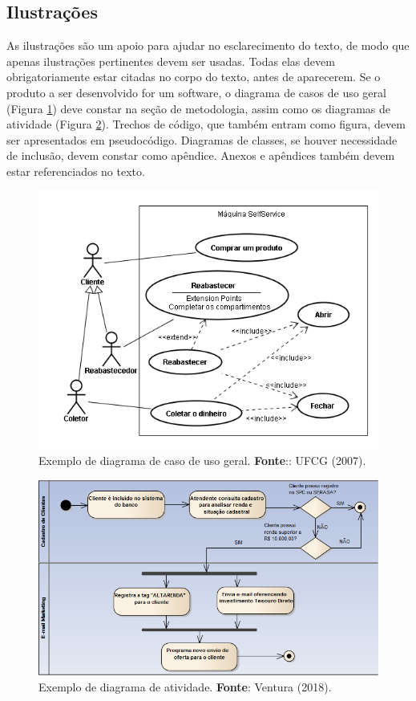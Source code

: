 \subsection{Ilustrações}\label{sec:Ilustracoes}
As ilustrações são um apoio para ajudar no esclarecimento do texto, de modo que apenas ilustrações pertinentes devem ser usadas. Todas elas devem obrigatoriamente estar citadas no corpo do texto, antes de aparecerem. 
Se o produto a ser desenvolvido for um software, o diagrama de casos de uso geral (Figura \ref{fig:CasoDeUso}) deve constar na seção de metodologia, assim como os diagramas de atividade (Figura \ref{fig:Atividades}). Trechos de código, que também entram como figura, devem ser apresentados em pseudocódigo. Diagramas de classes, se houver necessidade de inclusão, devem constar como apêndice. Anexos e apêndices também devem estar referenciados no texto. 

\begin{figure}[htb]
	\centering
	\includegraphics[scale=0.6]{imagens/DiagramaCasoDeUso.png} 
	\caption{Exemplo de diagrama de caso de uso geral. \textbf{Fonte}:: UFCG (2007).}
	\label{fig:CasoDeUso}
\end{figure}

\begin{figure}[htb]
	\centering
	\includegraphics[scale=0.6]{imagens/DiagramaAtividades.png} 
	\caption{Exemplo de diagrama de atividade. \textbf{Fonte}: Ventura (2018).}
	\label{fig:Atividades}
\end{figure}